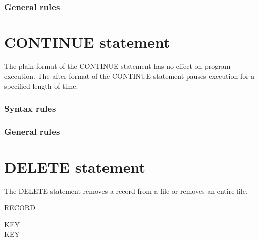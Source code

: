 \subsubsection{General rules}

\section{CONTINUE statement}

The plain format of the CONTINUE statement has no effect on program execution. The after format of the CONTINUE statement pauses execution for a specified length of time.

\begin{syntax}
\end{syntax}

\begin{syntax}
    \expression {}
\end{syntax}

\subsubsection{Syntax rules}

\subsubsection{General rules}

\section{DELETE statement}

The DELETE statement removes a record from a file or removes an entire file.

\begin{syntax}
   \filename RECORD

  \begin{0-1}
  \end{0-1}

  \begin{0+}
     KEY \imperativestatement \\
      KEY \imperativestatement
  \end{0+}

  \begin{0-1}
  \end{0-1}
\end{syntax}

